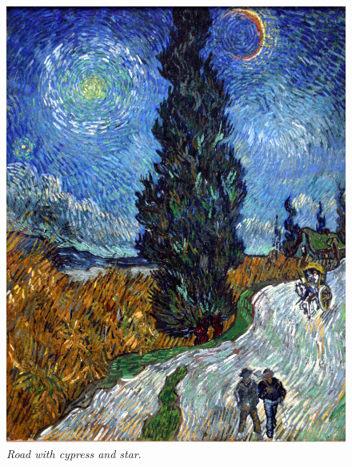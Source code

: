 \documentclass[12pt,a4paper]{article}
\numberwithin{equation}{section}
\begin{document}
\begin{figure}
    \centering
    \includegraphics[scale=0.12]{road_cypress.jpg}
    \caption{\emph{Road with cypress and star}.}
    \label{road}
\end{figure}
\end{document}
